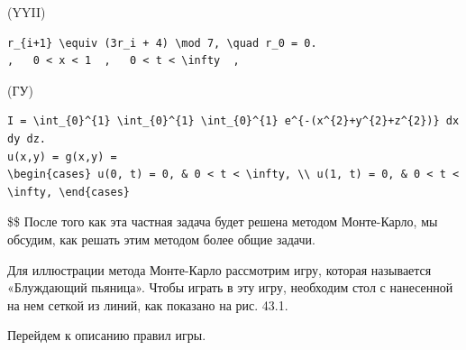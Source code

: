 \documentclass[
  ukrainian,
]{article}
\begin{document}
(YYII)

\begin{verbatim}
r_{i+1} \equiv (3r_i + 4) \mod 7, \quad r_0 = 0.
,   0 < x < 1  ,   0 < t < \infty  ,
\end{verbatim}

(ГУ)

\begin{verbatim}
I = \int_{0}^{1} \int_{0}^{1} \int_{0}^{1} e^{-(x^{2}+y^{2}+z^{2})} dx dy dz.
u(x,y) = g(x,y) =
\begin{cases} u(0, t) = 0, & 0 < t < \infty, \\ u(1, t) = 0, & 0 < t < \infty, \end{cases}
\end{verbatim}

\$\$ После того как эта частная задача будет решена методом Монте-Карло,
мы обсудим, как решать этим методом более общие задачи.

Для иллюстрации метода Монте-Карло рассмотрим игру, которая называется
«Блуждающий пьяница». Чтобы играть в эту игру, необходим стол с
нанесенной на нем сеткой из линий, как показано на рис. 43.1.

Перейдем к описанию правил игры.
\end{document}
